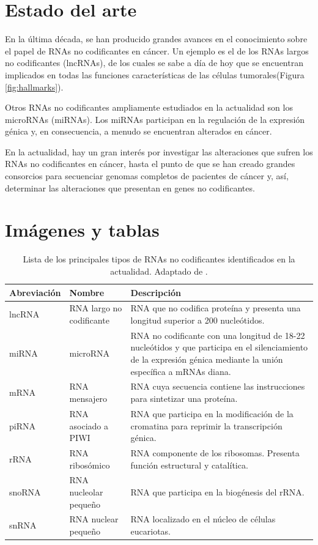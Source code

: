 \documentclass[a4paper,11pt]{article}
\begin{document}
\section{Estado del arte}

En la última década, se han producido grandes avances en el conocimiento sobre el papel de RNAs no codificantes en cáncer. Un ejemplo es el de los RNAs largos no codificantes (lncRNAs), de los cuales se sabe a día de hoy que se encuentran implicados en todas las funciones características de las células tumorales\cite{Schmitt2016}(Figura \ref{fig:hallmarks}).

Otros RNAs no codificantes ampliamente estudiados en la actualidad son los microRNAs (miRNAs). Los miRNAs participan en la regulación de la expresión génica y, en consecuencia, a menudo se encuentran alterados en cáncer\cite{Medina2008}.

En la actualidad, hay un gran interés por investigar las alteraciones que sufren los RNAs no codificantes en cáncer, hasta el punto de que se han creado grandes consorcios para secuenciar genomas completos de pacientes de cáncer y, así, determinar las alteraciones que presentan en genes no codificantes\cite{Khurana2016}.
\newpage


\section{Imágenes y tablas}

\begin{table}[h!]
\begin{tabular}{p{2cm}p{5cm}p{9cm}}
\textbf{Abreviación} & \textbf{Nombre} & \textbf{Descripción} \\
\hline
lncRNA & RNA largo no codificante & RNA que no codifica proteína y presenta una longitud superior a 200 nucleótidos. \\
miRNA & microRNA & RNA no codificante con una longitud de 18-22 nucleótidos y que participa en el silenciamiento de la expresión génica mediante la unión específica a mRNAs diana. \\
mRNA & RNA mensajero & RNA cuya secuencia contiene las instrucciones para sintetizar una proteína. \\
piRNA & RNA asociado a PIWI & RNA que participa en la modificación de la cromatina para reprimir la transcripción génica. \\
rRNA & RNA ribosómico & RNA componente de los ribosomas. Presenta función estructural y catalítica. \\
snoRNA & RNA nucleolar pequeño & RNA que participa en la biogénesis del rRNA. \\
snRNA & RNA nuclear pequeño & RNA localizado en el núcleo de células eucariotas. \\
\hline
\end{tabular}
\caption{Lista de los principales tipos de RNAs no codificantes identificados en la actualidad. Adaptado de \cite{Cech2014}.}
\label{table:ncRNAs}
\end{table}
\end{document}
